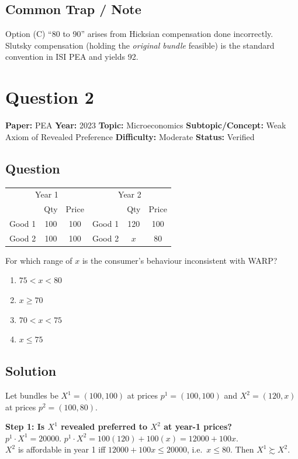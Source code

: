\documentclass[11pt]{article}
\begin{document}
\subsection*{Common Trap / Note}
Option (C) ``80 to 90'' arises from Hicksian compensation done incorrectly. Slutsky compensation (holding the \emph{original bundle} feasible) is the standard convention in ISI PEA and yields 92.

\medskip

\section*{Question 2}
\textbf{Paper:} PEA \quad \textbf{Year:} 2023 \quad \textbf{Topic:} Microeconomics \quad \textbf{Subtopic/Concept:} Weak Axiom of Revealed Preference \quad \textbf{Difficulty:} Moderate \quad \textbf{Status:} Verified

\subsection*{Question}
\begin{center}
\begin{tabular}{lcc|lcc}
\toprule
\multicolumn{3}{c|}{Year 1} & \multicolumn{3}{c}{Year 2} \\
& Qty & Price & & Qty & Price \\
\midrule
Good 1 & 100 & 100 & Good 1 & 120 & 100 \\
Good 2 & 100 & 100 & Good 2 & $x$ & 80 \\
\bottomrule
\end{tabular}
\end{center}
For which range of $x$ is the consumer's behaviour inconsistent with WARP?
\begin{enumerate}[label=(\Alph*)]
\item $75<x<80$
\item $x\ge 70$
\item $70<x<75$
\item $x\le 75$
\end{enumerate}

\subsection*{Solution}
Let bundles be $X^1=(100,100)$ at prices $p^1=(100,100)$ and $X^2=(120,x)$ at prices $p^2=(100,80)$.

\medskip\noindent\textbf{Step 1: Is $X^1$ revealed preferred to $X^2$ at year-1 prices?}\\
$p^1\cdot X^1=20000$. $p^1\cdot X^2=100(120)+100(x)=12000+100x$.\\
$X^2$ is affordable in year 1 iff $12000+100x\le 20000$, i.e.\ $x\le 80$. Then $X^1\succsim X^2$.
\end{document}
